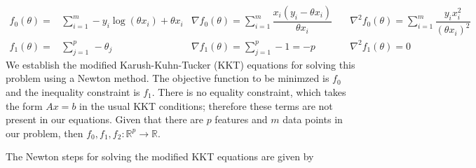 \documentclass[11pt]{article}
\begin{document}
\begin{align}
f_0(\theta) =& \sum_{i=1}^m -y_i\log{\left(\theta x_i\right)} +\theta x_i
&\nabla f_0(\theta) = \sum_{i=1}^m \dfrac{x_i\left(y_i-\theta x_i\right)}{\theta x_i}\quad
&\nabla^2 f_0(\theta) = \sum_{i=1}^m\dfrac{y_i x_i^2}{\left(\theta x_i\right)^2}\label{eq:objective}\\[0.2in]
f_1(\theta) =& \sum_{j=1}^p\,-\theta_j
&\nabla f_1(\theta) = \sum_{j=1}^p -1 = -p\quad
&\nabla^2 f_1(\theta) = 0\label{eq:constraints}
\end{align}
We establish the modified Karush-Kuhn-Tucker (KKT) equations for solving this problem using a Newton method. The objective function to be minimzed is $f_0$ and the inequality constraint is $f_1$. There is no equality constraint, which takes the form $Ax = b$ in the usual KKT conditions; therefore these terms are not present in our equations. Given that there are $p$ features and $m$ data points in our problem, then $f_0, f_1, f_2: \mathbb{R}^p \rightarrow \mathbb{R}.$ 

The Newton steps for solving the modified KKT equations are given by 
\end{document}
